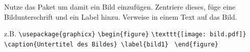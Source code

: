 
\item Nutze das Paket  um damit ein Bild einzufügen. Zentriere dieses, füge eine Bildunterschrift und ein Label hinzu. 
Verweise in einem Text auf das Bild.
\begin{loesung}
z.B. \verb|\usepackage{graphicx}|
     \verb|\begin{figure}|
     \verb|\texttt{[image: bild.pdf]}|
     \verb|\caption{Untertitel des Bildes} \label{bild1}|
     \verb| \end{figure}|
\end{loesung}
